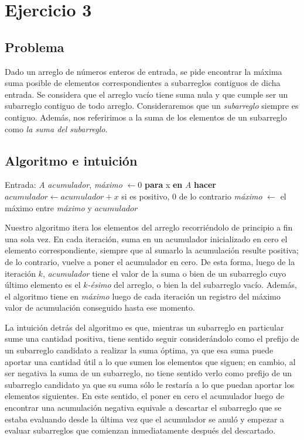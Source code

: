 \section{Ejercicio 3}

\subsection{Problema}
Dado un arreglo de números enteros de entrada, se pide encontrar la máxima suma posible de elementos correspondientes a subarreglos contiguos de dicha entrada. Se considera que el arreglo vacío tiene suma nula y que cumple ser un subarreglo contiguo de todo arreglo. Consideraremos que un \textit{subarreglo} siempre es contiguo. Además, nos referirimos a la suma de los elementos de un subarreglo como \textit{la suma del subarreglo}.

\subsection{Algoritmo e intuición}

\noindent Entrada: \textit{A} \newline
\textit{acumulador}, \textit{máximo} $\leftarrow 0$ \newline
\textbf{para} x \textbf{en} \textit{A} \textbf{hacer} \newline
\indent $\mathit{acumulador} \leftarrow \mathit{acumulador + x}$ si es positivo, $0$ de lo contrario \newline
\indent \textit{máximo} $\leftarrow$ el máximo entre \textit{máximo} y $\mathit{acumulador}$

\bigskip

Nuestro algoritmo itera los elementos del arreglo recorriéndolo de principio a fin una sola vez. En cada iteración, suma en un acumulador inicializado en cero el elemento correspondiente, siempre que al sumarlo la acumulación resulte positiva; de lo contrario, vuelve a poner el acumulador en cero. De esta forma, luego de la iteración $k$, \textit{acumulador} tiene el valor de la suma o bien de un subarreglo cuyo último elemento es el $k$\textit{-ésimo} del arreglo, o bien la del subarreglo vacío. Además, el algoritmo tiene en \textit{máximo} luego de cada iteración un registro del máximo valor de acumulación conseguido hasta ese momento.

La intuición detrás del algoritmo es que, mientras un subarreglo en particular sume una cantidad positiva, tiene sentido seguir considerándolo como el prefijo de un subarreglo candidato a realizar la suma óptima, ya que esa suma puede aportar una cantidad útil a lo que sumen los elementos que siguen; en cambio, al ser negativa la suma de un subarreglo, no tiene sentido verlo como prefijo de un subarreglo candidato ya que su suma sólo le restaría a lo que puedan aportar los elementos siguientes. En este sentido, el poner en cero el acumulador luego de encontrar una acumulación negativa equivale a descartar el subarreglo que se estaba evaluando desde la última vez que el acumulador se anuló y empezar a evaluar subarreglos que comienzan inmediatamente después del descartado.

